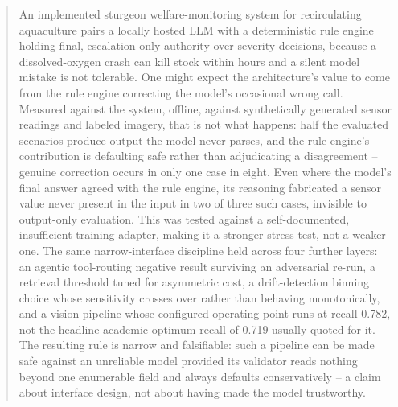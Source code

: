 \begin{abstract}
An implemented sturgeon welfare-monitoring system for recirculating aquaculture pairs a locally
hosted LLM with a deterministic rule engine holding final, escalation-only authority over severity
decisions, because a dissolved-oxygen crash can kill stock within hours and a silent model mistake
is not tolerable. One might expect the architecture's value to come from the rule engine correcting
the model's occasional wrong call. Measured against the system, offline, against synthetically generated sensor
readings and labeled imagery, that is not what happens:
half the evaluated scenarios produce output the model never parses, and the rule engine's
contribution is defaulting safe rather than adjudicating a disagreement -- genuine correction occurs
in only one case in eight. Even where the model's final answer agreed with the rule engine, its
reasoning fabricated a sensor value never present in the input in two of three such cases, invisible
to output-only evaluation. This was tested against a self-documented, insufficient training adapter,
making it a stronger stress test, not a weaker one. The same narrow-interface discipline held across
four further layers: an agentic tool-routing negative result surviving an adversarial re-run, a
retrieval threshold tuned for asymmetric cost, a drift-detection binning choice whose sensitivity
crosses over rather than behaving monotonically, and a vision pipeline whose configured operating
point runs at recall 0.782, not the headline academic-optimum recall of 0.719 usually quoted for
it. The resulting rule is narrow and falsifiable: such a pipeline can be made safe against an
unreliable model provided its validator reads nothing beyond one enumerable field and always
defaults conservatively -- a claim about interface design, not about having made the model
trustworthy.
\end{abstract}
